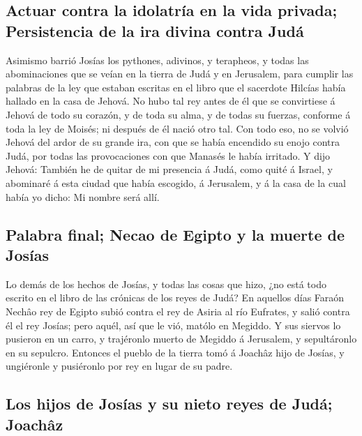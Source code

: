 \hypertarget{actuar-contra-la-idolatruxeda-en-la-vida-privada-persistencia-de-la-ira-divina-contra-juduxe1}{%
\subsection{Actuar contra la idolatría en la vida privada; Persistencia
de la ira divina contra
Judá}\label{actuar-contra-la-idolatruxeda-en-la-vida-privada-persistencia-de-la-ira-divina-contra-juduxe1}}

 Asimismo barrió Josías los pythones, adivinos, y
terapheos, y todas las abominaciones que se veían en la tierra de Judá y
en Jerusalem, para cumplir las palabras de la ley que estaban escritas
en el libro que el sacerdote Hilcías había hallado en la casa de Jehová.
 No hubo tal rey antes de él que se convirtiese á Jehová
de todo su corazón, y de toda su alma, y de todas su fuerzas, conforme á
toda la ley de Moisés; ni después de él nació otro tal. 
Con todo eso, no se volvió Jehová del ardor de su grande ira, con que se
había encendido su enojo contra Judá, por todas las provocaciones con
que Manasés le había irritado.  Y dijo Jehová: También he
de quitar de mi presencia á Judá, como quité á Israel, y abominaré á
esta ciudad que había escogido, á Jerusalem, y á la casa de la cual
había yo dicho: Mi nombre será allí.

\hypertarget{palabra-final-necao-de-egipto-y-la-muerte-de-josuxedas}{%
\subsection{Palabra final; Necao de Egipto y la muerte de
Josías}\label{palabra-final-necao-de-egipto-y-la-muerte-de-josuxedas}}

 Lo demás de los hechos de Josías, y todas las cosas que
hizo, ¿no está todo escrito en el libro de las crónicas de los reyes de
Judá?  En aquellos días Faraón Nechâo rey de Egipto subió
contra el rey de Asiria al río Eufrates, y salió contra él el rey
Josías; pero aquél, así que le vió, matólo en Megiddo.  Y
sus siervos lo pusieron en un carro, y trajéronlo muerto de Megiddo á
Jerusalem, y sepultáronlo en su sepulcro. Entonces el pueblo de la
tierra tomó á Joachâz hijo de Josías, y ungiéronle y pusiéronlo por rey
en lugar de su padre.

\hypertarget{los-hijos-de-josuxedas-y-su-nieto-reyes-de-juduxe1-joachuxe2z}{%
\subsection{Los hijos de Josías y su nieto reyes de Judá;
Joachâz}\label{los-hijos-de-josuxedas-y-su-nieto-reyes-de-juduxe1-joachuxe2z}}


